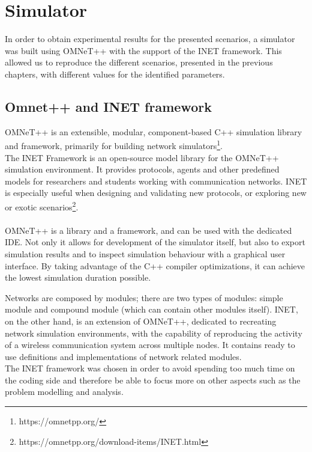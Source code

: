 %
\chapter{Simulator}\label{simulator}
In order to obtain experimental results for the presented scenarios, a simulator
was built using OMNeT++ with the support of the INET framework. This allowed us
to reproduce the different scenarios, presented in the previous chapters, with
different values for the identified parameters.\\
\section{Omnet++ and INET framework}
OMNeT++ is an extensible, modular, component-based C++ simulation library and
framework, primarily for building network simulators\footnote{https://omnetpp.org/}.\\
The INET Framework is an open-source model library for the OMNeT++ simulation
environment. It provides protocols, agents and other predefined models for
researchers and students working with communication networks. INET is especially
useful when designing and validating new protocols, or exploring new or exotic
scenarios\footnote{https://omnetpp.org/download-items/INET.html}.\\
\\
OMNeT++ is a library and a framework, and can be used with the dedicated IDE.
Not only it allows for development of the simulator itself, but also to export
simulation results and to inspect simulation behaviour with a graphical user
interface. By taking advantage of the C++ compiler optimizations, it can achieve the lowest
simulation duration possible.

Networks are composed by modules; there are two
types of modules: simple module and compound module (which can contain other
modules itself).
INET, on the other hand, is an extension of OMNeT++, dedicated to recreating 
network simulation environments, with the capability of reproducing the activity
of a wireless communication system across multiple nodes. It contains ready to
use definitions and implementations of network related modules.\\
The INET framework was chosen in order to avoid spending too
much time on the coding side and therefore be able to focus more on other
aspects such as the problem modelling and analysis.
